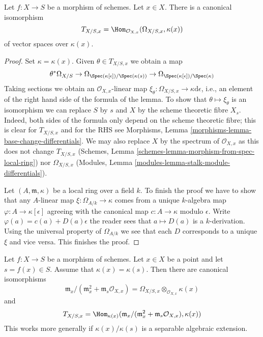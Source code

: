 \begin{lemma}
\label{lemma-tangent-space-cotangent-space}
Let $f : X \to S$ be a morphism of schemes. Let $x \in X$.
There is a canonical isomorphism
$$
T_{X/S, x} = \Hom_{\mathcal{O}_{X, x}}(\Omega_{X/S, x}, \kappa(x))
$$
of vector spaces over $\kappa(x)$.
\end{lemma}

\begin{proof}
Set $\kappa = \kappa(x)$.
Given $\theta \in T_{X/S, x}$ we obtain a map
$$
\theta^*\Omega_{X/S} \to
\Omega_{\Spec(\kappa[\epsilon])/\Spec(\kappa(s))} \to
\Omega_{\Spec(\kappa[\epsilon])/\Spec(\kappa)}
$$
Taking sections we obtain an $\mathcal{O}_{X, x}$-linear map
$\xi_\theta: \Omega_{X/S, x} \to \kappa \text{d}\epsilon$, i.e.,
an element of the right hand side of the
formula of the lemma. To show that $\theta \mapsto \xi_\theta$ is
an isomorphism we can replace $S$ by $s$ and $X$ by the
scheme theoretic fibre $X_s$. Indeed, both sides of the
formula only depend on the scheme theoretic fibre;
this is clear for $T_{X/S, x}$ and for the RHS see
Morphisms, Lemma \ref{morphisms-lemma-base-change-differentials}.
We may also replace $X$ by the spectrum of $\mathcal{O}_{X, x}$
as this does not change $T_{X/S, x}$
(Schemes, Lemma \ref{schemes-lemma-morphism-from-spec-local-ring})
nor $\Omega_{X/S, x}$
(Modules, Lemma \ref{modules-lemma-stalk-module-differentials}).

\medskip\noindent
Let $(A, \mathfrak m, \kappa)$ be a local ring over a field $k$.
To finish the proof we have to show that any $A$-linear map
$\xi : \Omega_{A/k} \to \kappa$ comes from a unique $k$-algebra
map $\varphi : A \to \kappa[\epsilon]$ agreeing with the canonical
map $c : A \to \kappa$ modulo $\epsilon$. Write
$\varphi(a) = c(a) + D(a) \epsilon$
the reader sees that $a \mapsto D(a)$ is a $k$-derivation.
Using the universal property of $\Omega_{A/k}$ we see that each
$D$ corresponds to a unique $\xi$ and vice versa. This finishes the proof.
\end{proof}

\begin{lemma}
\label{lemma-tangent-space-rational-point}
Let $f : X \to S$ be a morphism of schemes.
Let $x \in X$ be a point and let $s = f(x) \in S$.
Assume that $\kappa(x) = \kappa(s)$. Then there are canonical isomorphisms
$$
\mathfrak m_x/(\mathfrak m_x^2 + \mathfrak m_s\mathcal{O}_{X, x})
=
\Omega_{X/S, x} \otimes_{\mathcal{O}_{X, x}} \kappa(x)
$$
and
$$
T_{X/S, x} =
\Hom_{\kappa(x)}(
\mathfrak m_x/(\mathfrak m_x^2 + \mathfrak m_s\mathcal{O}_{X, x}),
\kappa(x))
$$
This works more generally if $\kappa(x)/\kappa(s)$ is a separable
algebraic extension.
\end{lemma}

